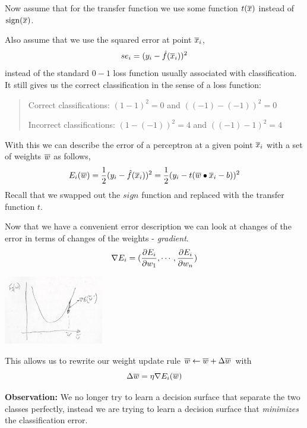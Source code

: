 \documentclass[a4paper,blends,pdf,colorBG,slideColor]{prosper}
\begin{document}
\vspace{.2in}

Now assume that for the transfer function we use some function $t(\overline{x})$ instead of $\sign(\ol{x})$.

\vspace{.2in}

Also assume that we use the squared error at point $\overline{x}_i$,
\[
se_i =  (y_i - \hat{f}(\overline{x}_i))^2
\]
instead of the standard $0-1$ loss function usually associated with classification.  It still gives us the correct classification in the
sense of a loss function:

\begin{quote}
Correct classifications: $(1-1)^2 = 0$ and $((-1) - (-1))^2 = 0$

Incorrect classifications: $(1 - (-1))^2 = 4$ and $((-1) - 1)^2 = 4$
\end{quote}
\es

With this we can describe the error of a perceptron at a given point $\overline{x}_i$ with a set of weights $\overline{w}$ as follows,
\[
E_i(\overline{w}) = \frac{1}{2} (y_i - \hat{f}(\overline{x}_i))^2 =  \frac{1}{2} (y_i - t(\overline{w}\bullet\overline{x}_i - b))^2
\]
Recall that we swapped out the $sign$ function and replaced with the transfer function $t$.
\es

Now that we have a convenient error description we can look at changes of the error in terms of changes of the weights - {\em gradient}.
\[
\nabla E_i = (\frac{\partial E_i}{\partial w_1},\cdots,\frac{\partial E_i}{\partial w_n})
\]

\vspace{.2in}

\begin{center}
\includegraphics[height=30mm]{images/error-gradient.eps}
\end{center}

This allows us to rewrite our weight update rule $ \overline{w} \leftarrow \overline{w} + \Delta \overline{w}$ with
\[
\Delta \overline{w} = \eta \nabla E_i(\overline{w})
\]
\es

{\bf Observation:} We no longer try to learn a decision surface that separate the two classes perfectly, instead we are trying to learn a decision
surface that {\em minimizes} the classification error.
\es
\end{document}
